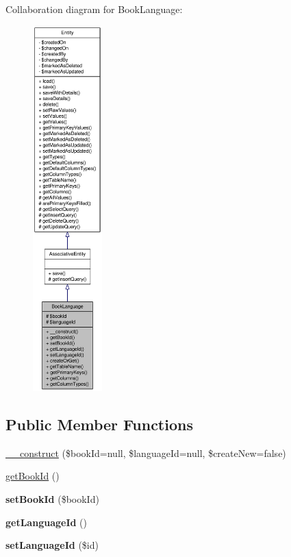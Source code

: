 Collaboration diagram for BookLanguage:\nopagebreak
\begin{figure}[H]
\begin{center}
\leavevmode
\includegraphics[height=400pt]{classBookLanguage__coll__graph}
\end{center}
\end{figure}
\subsection*{Public Member Functions}
\begin{DoxyCompactItemize}
\item 
\hyperlink{classBookLanguage_a244f8af6147e237845222422611bf08f}{\_\-\_\-construct} (\$bookId=null, \$languageId=null, \$createNew=false)
\item 
\hyperlink{classBookLanguage_ae0a6dbbcc16626c4eda99ebccc090781}{getBookId} ()
\item 
\hypertarget{classBookLanguage_a4d9295cfd5bcdc8a0e648194404d1bcc}{
{\bfseries setBookId} (\$bookId)}
\label{classBookLanguage_a4d9295cfd5bcdc8a0e648194404d1bcc}

\item 
\hypertarget{classBookLanguage_ab573677e431d72216d45a4cf3e248de4}{
{\bfseries getLanguageId} ()}
\label{classBookLanguage_ab573677e431d72216d45a4cf3e248de4}

\item 
\hypertarget{classBookLanguage_ab8544234c7f5b5691ec471022bed143f}{
{\bfseries setLanguageId} (\$id)}
\label{classBookLanguage_ab8544234c7f5b5691ec471022bed143f}

\end{DoxyCompactItemize}
